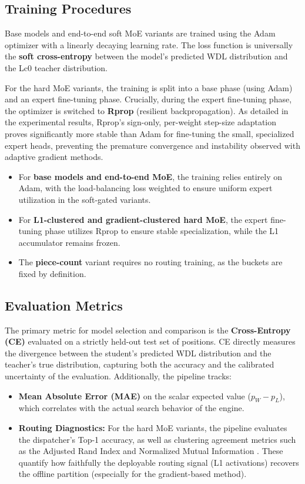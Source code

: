 \subsection{Training Procedures}

Base models and end-to-end soft MoE variants are trained using the Adam optimizer \parencite{kingma2015} with a linearly decaying learning rate. The loss function is universally the \textbf{soft cross-entropy} between the model's predicted WDL distribution and the Lc0 teacher distribution. 

For the hard MoE variants, the training is split into a base phase (using Adam) and an expert fine-tuning phase. Crucially, during the expert fine-tuning phase, the optimizer is switched to \textbf{Rprop} (resilient backpropagation). As detailed in the experimental results, Rprop's sign-only, per-weight step-size adaptation proves significantly more stable than Adam for fine-tuning the small, specialized expert heads, preventing the premature convergence and instability observed with adaptive gradient methods.

\begin{itemize}
	\item For \textbf{base models and end-to-end MoE}, the training relies entirely on Adam, with the load-balancing loss weighted to ensure uniform expert utilization in the soft-gated variants.
	\item For \textbf{L1-clustered and gradient-clustered hard MoE}, the expert fine-tuning phase utilizes Rprop to ensure stable specialization, while the L1 accumulator remains frozen.
	\item The \textbf{piece-count} variant requires no routing training, as the buckets are fixed by definition.
\end{itemize}

\subsection{Evaluation Metrics}

The primary metric for model selection and comparison is the \textbf{Cross-Entropy (CE)} evaluated on a strictly held-out test set of positions. CE directly measures the divergence between the student's predicted WDL distribution and the teacher's true distribution, capturing both the accuracy and the calibrated uncertainty of the evaluation. Additionally, the pipeline tracks:

\begin{itemize}
	\item \textbf{Mean Absolute Error (MAE)} on the scalar expected value ($p_W - p_L$), which correlates with the actual search behavior of the engine.
	\item \textbf{Routing Diagnostics:} For the hard MoE variants, the pipeline evaluates the dispatcher's Top-1 accuracy, as well as clustering agreement metrics such as the Adjusted Rand Index \parencite{hubert1985} and Normalized Mutual Information \parencite{strehl2002}. These quantify how faithfully the deployable routing signal (L1 activations) recovers the offline partition (especially for the gradient-based method).
\end{itemize}
